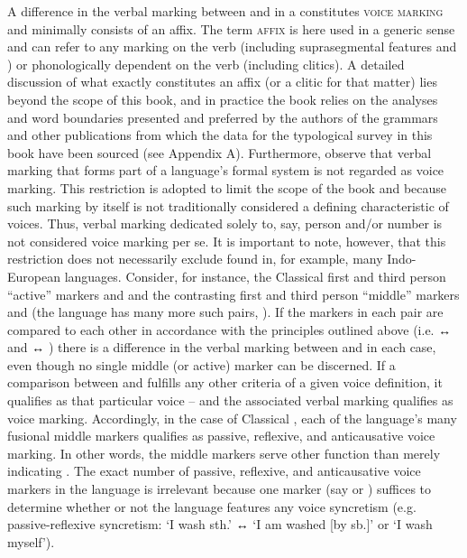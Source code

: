 A difference in the verbal marking between  and  in a  constitutes \textsc{voice marking} and minimally consists of an affix. The term \textsc{affix} is here used in a generic sense and can refer to any marking on the verb (including suprasegmental features and ) or phonologically dependent on the verb (including clitics). A detailed discussion of what exactly constitutes an affix (or a clitic for that matter) lies beyond the scope of this book, and in practice the book relies on the analyses and word boundaries presented and preferred by the authors of the grammars and other publications from which the data for the typological survey in this book have been sourced (see Appendix A). Furthermore, observe that verbal marking that forms part of a language’s formal  system is not regarded as voice marking. This restriction is adopted to limit the scope of the book and because such marking by itself is not traditionally considered a defining characteristic of voices. Thus, verbal marking dedicated solely to, say, person and/or number  is not considered voice marking per se. It is important to note, however, that this restriction does not necessarily exclude  found in, for example, many Indo-European languages. Consider, for instance, the Classical  first and third person “active” markers  and  and the contrasting first and third person “middle” markers  and  (the language has many more such pairs, \citealt[169]{zuniga:kittila:2019}). If the markers in each pair are compared to each other in accordance with the principles outlined above (i.e.   ↔   and   ↔  ) there is a difference in the verbal marking between  and  in each case, even though no single middle (or active) marker can be discerned. If a comparison between  and  fulfills any other criteria of a given voice definition, it qualifies as that particular voice -- and the associated verbal marking qualifies as voice marking. Accordingly, in the case of Classical , each of the language’s many fusional middle markers qualifies as passive, reflexive, and anticausative voice marking. In other words, the middle markers serve other function than merely indicating . The exact number of passive, reflexive, and anticausative voice markers in the language is irrelevant because one marker (say  or ) suffices to determine whether or not the language features any voice syncretism (e.g. passive-reflexive syncretism:  ‘I wash sth.’ ↔  ‘I am washed [by sb.]’ or ‘I wash myself’). 

